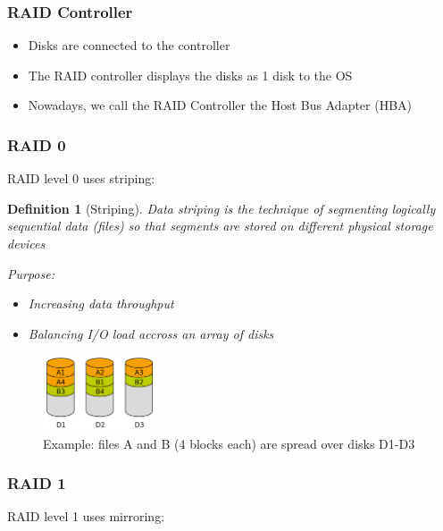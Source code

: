 \documentclass{article}
\newtheorem{theorem}{Definition}[section]
\begin{document}
\subsubsection{RAID Controller}

\begin{itemize}
    \item Disks are connected to the controller
    \item The RAID controller displays the disks as 1 disk to the OS
    \item Nowadays, we call the RAID Controller the Host Bus Adapter (HBA)
\end{itemize}

\subsubsection{RAID 0}

RAID level 0 uses striping:

\begin{theorem}[Striping]
    Data striping is the technique of segmenting logically sequential data (files) so that segments are stored on different physical storage devices

    Purpose:

    \begin{itemize}
        \item Increasing data throughput
        \item Balancing I/O load accross an array of disks
    \end{itemize}
\end{theorem}

\begin{figure}[H]
    \centering
    \includegraphics[width=0.3\textwidth]{raid-striping.png}
    \caption{Example: files A and B (4 blocks each) are spread over disks D1-D3}
\end{figure}


\subsubsection{RAID 1}

RAID level 1 uses mirroring:
\end{document}

